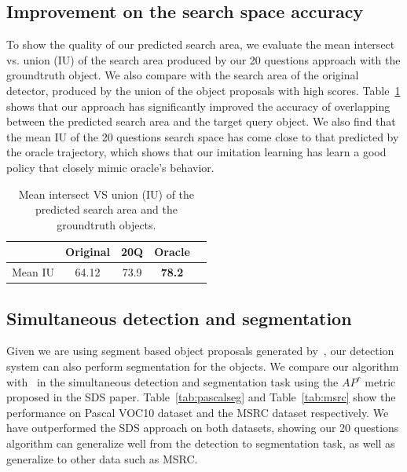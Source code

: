\subsection{Improvement on the search space accuracy} To show the quality of our predicted search area, we evaluate the mean intersect vs. union (IU) of the search area produced by our 20 questions approach with the groundtruth object. We also compare with the search area of the original detector, produced by the union of the object proposals with high scores. Table~\ref{tab:space} shows that our approach has significantly improved the accuracy of overlapping between the predicted search area and the target query object.  We also find that the mean IU of the 20 questions search space has come close to that predicted by the oracle trajectory, which shows that our imitation learning has learn a good policy that closely mimic oracle's behavior.
\begin{table}\scriptsize                               
\begin{center}
\begin{tabular}{|c|c|c|c|c|}                    
\hline                                          
 & Original & 20Q  & Oracle \\          
\hline                                          
 Mean IU & 64.12 &  73.9 &  \textbf{78.2} \\        
\hline                                          
\end{tabular}     
\end{center}                              
\caption{Mean intersect VS union (IU) of the predicted search area and the groundtruth objects. }                        
\label{tab:space}                      
\end{table}  

\subsection{Simultaneous detection and segmentation}
Given we are using segment based object proposals generated by~\cite{arbelaez2014multiscale}, our detection system can also perform segmentation for the objects. We compare our algorithm with~\cite{BharathECCV2014} in  the simultaneous detection and segmentation task using the $AP^r$ metric proposed in the SDS paper. Table~\ref{tab:pascalseg} and Table~\ref{tab:msrc} show the performance on Pascal VOC10 dataset and the MSRC dataset respectively. We have outperformed the SDS approach on both datasets, showing our 20 questions algorithm can generalize well from the detection to segmentation task, as well as generalize to other data such as MSRC.





